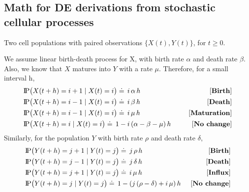 \documentclass[11pt]{article} %
\newcommand{\probP}{\text{I\kern-0.15em P}}
\newcommand{\gray}[1]{{\color{mygray}{#1}}}
\begin{document}
\pagestyle{fancy}
\fancyhf{}
\rhead{\textit{\gray{}}}

\subsection*{Math for DE derivations from stochastic cellular processes}
\vspace{0.4cm}
Two cell populations with paired observations $\{X(t), Y(t)\}$, for $t \ge 0$. 

We assume linear birth-death process for X, with birth rate $\alpha$ and death rate $\beta$. Also, we know that $X$ matures into $Y$ with a rate $\mu$. Therefore, for a small interval h, 
\begin{align*}
& \probP\big(X(t+h) = i+1 \;|\; X(t) = i \big) \doteq \, i \, \alpha \, h  \qquad \qquad \qquad &[\textbf{Birth}] \\
& \probP\big(X(t+h) = i-1 \;|\; X(t) = i \big) \doteq \, i \, \beta \, h  &[\textbf{Death}] \\
& \probP\big(X(t+h) = i-1 \;|\; X(t) = i \big) \doteq \, i \, \mu \, h   &[\textbf{Maturation}] \\
& \probP\big(X(t+h) = i \;|\; X(t) = i \big) \doteq \, 1 - i \, (\alpha - \beta - \mu) \, h  &[\textbf{No change}] 
\end{align*}
Similarly, for the population $Y$ with birth rate $\rho$ and death rate $\delta$,
\begin{align*}
& \probP\big(Y(t+h) = j+1 \;|\; Y(t) = j \big) \doteq \, j \, \rho \, h  \qquad \qquad \qquad &[\textbf{Birth}] \\
& \probP\big(Y(t+h) = j-1 \;|\; Y(t) = j \big) \doteq \, j \, \delta \, h  &[\textbf{Death}] \\
& \probP\big(Y(t+h) = j+1 \;|\; Y(t) = j \big) \doteq \, i \, \mu \, h   &[\textbf{Influx}] \\
& \probP\big(Y(t+h) = j   \;|\; Y(t) = j \big) \doteq \, 1 - (j \, (\rho - \delta) + i \, \mu) \, h  &[\textbf{No change}] 
\end{align*}

\vspace{5mm}
\end{document}
